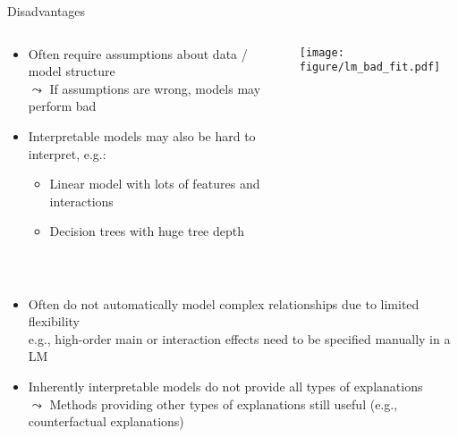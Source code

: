 \documentclass[11pt,compress,t,notes=noshow, aspectratio=169, xcolor=table]{beamer}
\begin{document}
\begin{frame}{Disadvantages}
\begin{columns}[totalwidth=\textwidth]
\begin{column}{0.75\textwidth}
    \begin{itemize}%
    \itemsep1em
        \item<1-> Often require assumptions about data / model structure \\%
        $\leadsto$ If assumptions are wrong, models may perform bad 
        \item<2-> Interpretable models may also be hard to interpret, e.g.:
    \begin{itemize}
        \item Linear model with lots of features and interactions 
        \item Decision trees with huge tree depth
    \end{itemize}
    \end{itemize}
\end{column}
\begin{column}{0.25\textwidth}
    \begin{center}
        \texttt{[image: figure/lm\_bad\_fit.pdf]} 
    \end{center}
\end{column}
\end{columns}
\quad \\

\begin{itemize}
\itemsep1em
        \item<3-> 
        Often do not automatically model complex relationships due to limited flexibility
        \\
        e.g., high-order main or interaction effects need to be specified manually in a LM

     \item<4-> Inherently interpretable models do not provide all types of explanations
     \\
     $\leadsto$ Methods providing other types of explanations still useful  (e.g., counterfactual explanations)
\end{itemize}
\end{frame}
\end{document}
